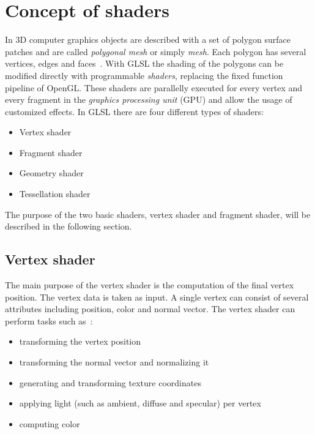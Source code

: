\section{Concept of shaders}
In 3D computer graphics objects are described with a set of polygon surface patches and are called \emph{polygonal mesh} or simply \emph{mesh}. Each polygon has several vertices, edges and faces~\cite{book:computerGraphicsHearn}. With GLSL the shading of the polygons can be modified directly with programmable \emph{shaders}, replacing the fixed function pipeline of OpenGL. These shaders are parallelly executed for every vertex and every fragment in the \emph{graphics processing unit} (GPU) and allow the usage of customized effects. In GLSL there are four different types of shaders:
\begin{itemize}
	\item Vertex shader
	\item Fragment shader
	\item Geometry shader
	\item Tessellation shader
\end{itemize}

The purpose of the two basic shaders, vertex shader and fragment shader, will be described in the following section.

\subsection{Vertex shader}
The main purpose of the vertex shader is the computation of the final vertex position. The vertex data is taken as input. A single vertex can consist of several attributes including position, color and normal vector. The vertex shader can perform tasks such as~\cite{book:computerGraphicsHill}: %
\begin{itemize}
	\item transforming the vertex position
	\item transforming the normal vector and normalizing it
	\item generating and transforming texture coordinates
	\item applying light (such as ambient, diffuse and specular) per vertex
	\item computing color
\end{itemize}

